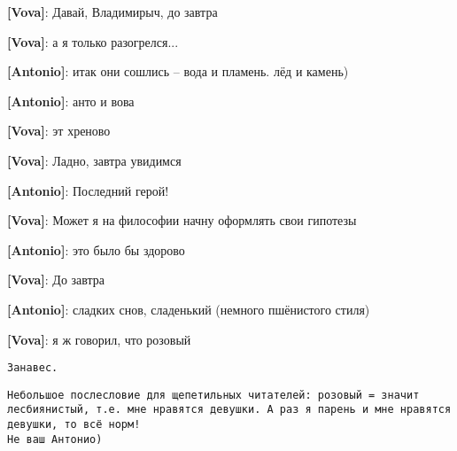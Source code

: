 \begin{flushleft}
\textbf{[Vova]}: Давай, Владимирыч, до завтра

\textbf{[Vova]}: а я только разогрелся...

\textbf{[Antonio]}: итак они сошлись -- вода и пламень. лёд и камень)

\textbf{[Antonio]}: анто и вова

\textbf{[Vova]}: эт хреново

\textbf{[Vova]}: Ладно, завтра увидимся

\textbf{[Antonio]}: Последний герой!

\textbf{[Vova]}: Может я на философии начну оформлять свои гипотезы

\textbf{[Antonio]}: это было бы здорово

\textbf{[Vova]}: До завтра

\textbf{[Antonio]}: сладких снов, сладенький (немного пшёнистого стиля)

\textbf{[Vova]}: я ж говорил, что розовый
\end{flushleft}

{\small\texttt{Занавес.}}

{\tiny\texttt{Небольшое послесловие для щепетильных читателей: розовый = значит лесбиянистый, т.е. мне нравятся девушки. А раз я парень и мне нравятся девушки, то всё норм!\\
Не ваш Антонио)}}
